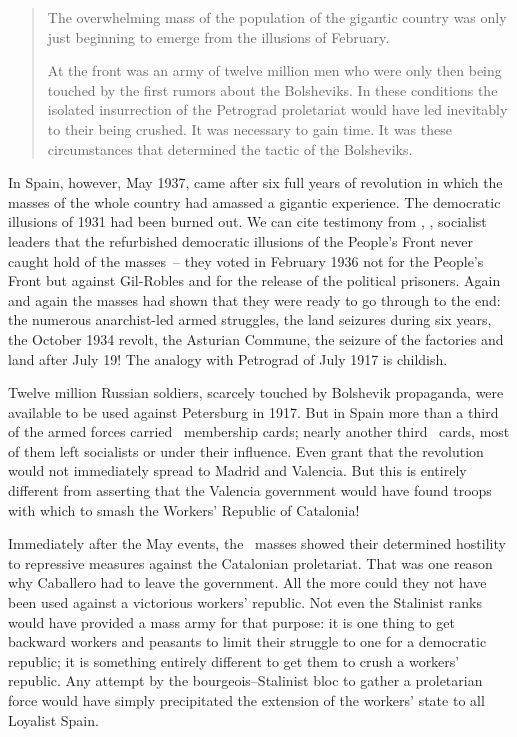\begin{quotation}
  The overwhelming mass of the population of the gigantic country was only just beginning to emerge from the illusions of February.
  
  At the front was an army of twelve million men who were only then being touched by the first rumors about the Bolsheviks. In these conditions the isolated insurrection of the Petrograd proletariat would have led inevitably to their being crushed. It was necessary to gain time. It was these circumstances that determined the tactic of the Bolsheviks.
\end{quotation}

In Spain, however, May 1937, came after six full years of revolution in which the masses of the whole country had amassed a gigantic experience. The democratic illusions of 1931 had been burned out. We can cite testimony from \CNT\kn, \POUM\kn, socialist leaders that the refurbished democratic illusions of the People’s Front never caught hold of the masses~-- they voted in February 1936 not for the People’s Front but against Gil-Robles and for the release of the political prisoners. Again and again the masses had shown that they were ready to go through to the end: the numerous anarchist-led armed struggles, the land seizures during six years, the October 1934 revolt, the Asturian Commune, the seizure of the factories and land after July 19! The analogy with Petrograd of July 1917 is childish.

Twelve million Russian soldiers, scarcely touched by Bolshevik propaganda, were available to be used against Petersburg in 1917. But in Spain more than a third of the armed forces carried \CNT\ membership cards; nearly another third \UGT\ cards, most of them left socialists or under their influence. Even grant that the revolution would not immediately spread to Madrid and Valencia. But this is entirely different from asserting that the Valencia government would have found troops with which to smash the Workers’ Republic of Catalonia!


Immediately after the May events, the \UGT\ masses showed their determined hostility to repressive measures against the Catalonian proletariat. That was one reason why Caballero had to leave the government. All the more could they not have been used against a victorious workers’ republic. Not even the Stalinist ranks would have provided a mass army for that purpose: it is one thing to get backward workers and peasants to limit their struggle to one for a democratic republic; it is something entirely different to get them to crush a workers’ republic. Any attempt by the bourgeois--Stalinist bloc to gather a proletarian force would have simply precipitated the extension of the workers’ state to all Loyalist Spain.


